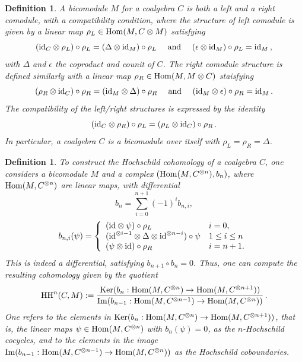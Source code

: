 \documentclass[12pt]{amsart}
\newtheorem{defn}[prop]{Definition}
\numberwithin{equation}{section}
\def\Hom{{\rm Hom}}
\begin{document}
\begin{defn}\label{bicomoddef}
A bicomodule $M$ for a coalgebra $C$ is both a left and a right
comodule, with a compatibility condition, where the structure of left comodule is given by a linear map
$\rho_L \in \Hom(M, C\otimes M)$ satisfying
$$( {\rm id}_C\otimes \rho_L) \circ \rho_L = (\Delta \otimes {\rm id}_M) \circ \rho_L  \ \ \ \text{ and } \ \ \ 
(\epsilon \otimes {\rm id}_M) \circ \rho_L = {\rm id}_M\, , $$
with $\Delta$ and $\epsilon$ the coproduct and counit of $C$. The right comodule
structure is defined similarly with a linear map $\rho_R \in \Hom(M, M\otimes C)$ staisfying
$$ ( \rho_R \otimes {\rm id}_C) \circ \rho_R = ({\rm id}_M \otimes  \Delta) \circ \rho_R  \ \ \ \text{ and } \ \ \ 
({\rm id}_M \otimes  \epsilon) \circ \rho_R = {\rm id}_M\, . $$
The compatibility of the left/right structures is expressed by the identity 
\begin{equation}\label{compatcomod}
( {\rm id}_C\otimes \rho_R) \circ \rho_L =(\rho_L \otimes {\rm id}_C) \circ \rho_R\, .
\end{equation}
In particular, a coalgebra $C$ is a bicomodule over itself with $\rho_L=\rho_R=\Delta$.
\end{defn}

\smallskip

\begin{defn}\label{HHcoalgdef}
To construct the Hochschild cohomology of a coalgebra $C$, one considers a bicomodule $M$
and a complex $(\Hom(M, C^{\otimes n}), b_n)$, where
$\Hom(M, C^{\otimes n})$ are  linear maps, with differential
\begin{equation}\label{bndiff}
 b_n = \sum_{i=0}^{n+1} (-1)^i b_{n,i}, 
\end{equation}
\begin{equation}\label{bndiff2} 
 b_{n,i}(\psi) = \left\{ \begin{array}{ll} ({\rm id}\otimes \psi)\circ \rho_L & i=0, \\
({\rm id}^{\otimes i-1} \otimes \Delta \otimes {\rm id}^{\otimes n-i}) \circ \psi &  1\leq i \leq n \\
(\psi \otimes {\rm id})\circ \rho_R & i=n+1 . 
\end{array}\right. 
\end{equation}
This is indeed a differential, satisfying $b_{n+1}\circ b_n=0$. Thus, one can compute
the resulting cohomology given by the quotient
$$ {\rm HH}^n(C,M):= \frac{{\rm Ker}(b_n: \Hom(M, C^{\otimes n}) \to \Hom(M, C^{\otimes n+1}))}{ {\rm Im}(b_{n-1}: \Hom(M, C^{\otimes n-1}) \to \Hom(M, C^{\otimes n}))}\, . $$
One refers to the elements in ${\rm Ker}(b_n: \Hom(M, C^{\otimes n}) \to \Hom(M, C^{\otimes n+1}))$, that is,
the linear maps $\psi\in \Hom(M, C^{\otimes n})$ with $b_n(\psi)=0$, as the $n$-Hochschild cocycles, and
to the elements in the image ${\rm Im}(b_{n-1}: \Hom(M, C^{\otimes n-1}) \to \Hom(M, C^{\otimes n}))$ as the
Hochschild coboundaries. 
\end{defn}
\end{document}
